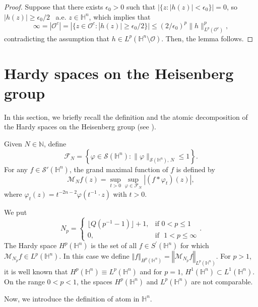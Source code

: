 \documentclass[reqno,10pt]{article}
\theoremstyle{definition}
\numberwithin{equation}{section}
\numberwithin{theorem}{section}
\begin{document}
\begin{proof}
Suppose that there exists $\epsilon_0 > 0$ such that $|\{ z : |h(z)| < \epsilon_0 \}| = 0$, so $|h(z)| \geq \epsilon_{0}/2$ \,
a.e. $z \in \mathbb{H}^n$, which implies that
\[
\infty = |\mathcal{O}^c| = |\{ z \in \mathcal{O}^c : |h(z)| \geq \epsilon_{0}/2 \}| \leq (2/\epsilon_{0})^p \| h \|_{L^p(\mathcal{O}^c)}^{p},
\]
contradicting the assumption that $h \in L^p(\mathbb{H}^n \setminus \mathcal{O})$. Then, the lemma follows.
\end{proof}

\section{Hardy spaces on the Heisenberg group}

In this section, we briefly recall the definition and the atomic decomposition of the Hardy spaces on the Heisenberg group 
(see \cite{Foll-St}).

Given $N \in \mathbb{N}$, define 
\[
\mathcal{F}_{N}=\left\{ \varphi \in \mathcal{S}(\mathbb{H}^{n}) : \| \varphi \|_{\mathcal{S}(\mathbb{H}^{n}), \, N} \leq 1 \right\}.
\]
For any $f \in \mathcal{S}'(\mathbb{H}^{n})$, the grand maximal function of $f$ is defined by 
\[
\mathcal{M}_N f(z)=\sup\limits_{t>0}\sup\limits_{\varphi \in \mathcal{F}_{N}}\left\vert \left( f \ast \varphi_t \right)(z) \right\vert,
\]
where $\varphi_t(z) = t^{-2n-2} \varphi(t^{-1} \cdot z)$ with $t > 0$. 

We put
\begin{equation}
N_p = \left\{ \begin{array}{cc}
                 \lfloor Q(p^{-1}-1) \rfloor + 1, & \text{if} \,\, 0 < p \leq 1  \\
                 0, & \text{if} \,\,\,\, 1 < p \leq \infty
               \end{array} \right..
\end{equation}
The Hardy space $H^{p}(\mathbb{H}^{n})$ is the set of all $f \in S^{\prime}
(\mathbb{H}^{n})$ for which $\mathcal{M}_{N_p}f \in L^{p}(\mathbb{H}^{n})$. In this case we define 
$\left\Vert f \right\Vert _{H^{p}(\mathbb{H}^{n})} = \left\Vert \mathcal{M}_{N_p}f \right\Vert_{L^{p}(\mathbb{H}^{n})}$. For $p > 1$, it is well known that $H^p(\mathbb{H}^{n}) \equiv L^p(\mathbb{H}^{n})$ and for $p=1$, $H^1(\mathbb{H}^{n}) \subset L^1(\mathbb{H}^{n})$. On the range $0 < p < 1$, the spaces $H^{p}(\mathbb{H}^{n})$ and $L^{p}(\mathbb{H}^{n})$ are not comparable.

Now, we introduce the definition of atom in $\mathbb{H}^n$.
\end{document}
